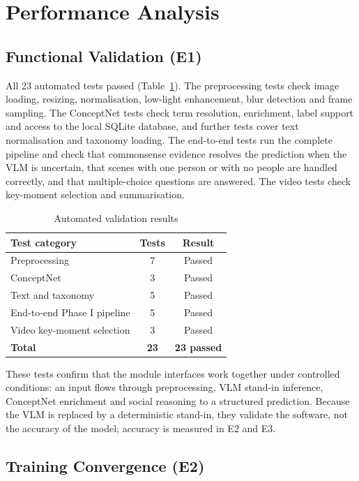 \documentclass[12pt,a4paper,oneside]{report}
\begin{document}
\section{Performance Analysis}

\subsection{Functional Validation (E1)}

All 23 automated tests passed (Table~\ref{tab:tests}). The preprocessing tests
check image loading, resizing, normalisation, low-light enhancement, blur
detection and frame sampling. The ConceptNet tests check term resolution,
enrichment, label support and access to the local SQLite database, and further
tests cover text normalisation and taxonomy loading. The end-to-end tests run
the complete pipeline and check that commonsense evidence resolves the
prediction when the VLM is uncertain, that scenes with one person or with no
people are handled correctly, and that multiple-choice questions are answered.
The video tests check key-moment selection and summarisation.

\begin{table}[htbp]
\centering
\caption{Automated validation results}
\label{tab:tests}
\small
\begin{tabular}{@{}lcc@{}}
\toprule
\textbf{Test category} & \textbf{Tests} & \textbf{Result}\\
\midrule
Preprocessing & 7 & Passed\\
ConceptNet & 3 & Passed\\
Text and taxonomy & 5 & Passed\\
End-to-end Phase I pipeline & 5 & Passed\\
Video key-moment selection & 3 & Passed\\
\midrule
\textbf{Total} & \textbf{23} & \textbf{23 passed}\\
\bottomrule
\end{tabular}
\end{table}

These tests confirm that the module interfaces work together under controlled
conditions: an input flows through preprocessing, VLM stand-in inference,
ConceptNet enrichment and social reasoning to a structured prediction. Because
the VLM is replaced by a deterministic stand-in, they validate the software, not
the accuracy of the model; accuracy is measured in E2 and E3.

\subsection{Training Convergence (E2)}
\end{document}
